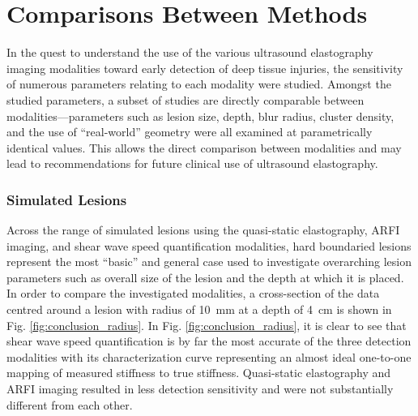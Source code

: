 	\section{Comparisons Between Methods}
	\label{sec:method_comparisons}
		In the quest to understand the use of the various ultrasound elastography imaging modalities toward early detection of deep tissue injuries, the sensitivity of numerous parameters relating to each modality were studied. Amongst the studied parameters, a subset of studies are directly comparable between modalities---parameters such as lesion size, depth, blur radius, cluster density, and the use of ``real-world'' geometry were all examined at parametrically identical values. This allows the direct comparison between modalities and may lead to recommendations for future clinical use of ultrasound elastography.

		\subsubsection{Simulated Lesions}
		\label{subsubsec:conclusion_simulated_lesions}
			Across the range of simulated lesions using the quasi-static elastography, ARFI imaging, and shear wave speed quantification modalities, hard boundaried lesions represent the most ``basic'' and general case used to investigate overarching lesion parameters such as overall size of the lesion and the depth at which it is placed. In order to compare the investigated modalities, a cross-section of the data centred around a lesion with radius of \SI{10}{\mm} at a depth of \SI{4}{\cm} is shown in Fig. \ref{fig:conclusion_radius}. In Fig. \ref{fig:conclusion_radius}, it is clear to see that shear wave speed quantification is by far the most accurate of the three detection modalities with its characterization curve representing an almost ideal one-to-one mapping of measured stiffness to true stiffness. Quasi-static elastography and ARFI imaging resulted in less detection sensitivity and were not substantially different from each other.

